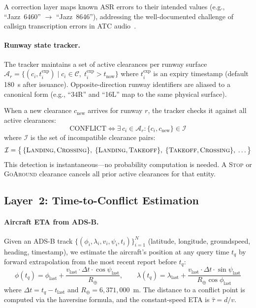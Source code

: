 \documentclass[11pt,a4paper]{article}
\begin{document}
A correction layer maps known ASR errors to their intended values (e.g., ``Jazz~6460'' $\to$ ``Jazz~8646''), addressing the well-documented challenge of callsign transcription errors in ATC audio~\citep{zuluaga2023atcnlp}.

\paragraph{Runway state tracker.}
The tracker maintains a set of active clearances per runway surface $\mathcal{A}_r = \{(c_i, t_i^{\mathrm{exp}}) \mid c_i \in \mathcal{C}, \; t_i^{\mathrm{exp}} > t_{\mathrm{now}}\}$ where $t_i^{\mathrm{exp}}$ is an expiry timestamp (default 180~s after issuance).
Opposite-direction runway identifiers are aliased to a canonical form (e.g., ``34R'' and ``16L'' map to the same physical surface).

When a new clearance $c_{\mathrm{new}}$ arrives for runway $r$, the tracker checks it against all active clearances:
\begin{equation}
    \text{CONFLICT} \iff \exists \, c_i \in \mathcal{A}_r : \{c_i, c_{\mathrm{new}}\} \in \mathcal{I}
    \label{eq:conflict}
\end{equation}
where $\mathcal{I}$ is the set of incompatible clearance pairs:
\begin{equation}
    \mathcal{I} = \bigl\{\,\{\textsc{Landing}, \textsc{Crossing}\},\; \{\textsc{Landing}, \textsc{Takeoff}\},\; \{\textsc{Takeoff}, \textsc{Crossing}\},\; \ldots\,\bigr\}
\end{equation}
This detection is instantaneous---no probability computation is needed.
A \textsc{Stop} or \textsc{GoAround} clearance cancels all prior active clearances for that entity.

\subsection{Layer~2: Time-to-Conflict Estimation}
\label{sec:layer2}

\paragraph{Aircraft ETA from ADS-B.}
Given an ADS-B track $\{(\phi_i, \lambda_i, v_i, \psi_i, t_i)\}_{i=1}^{N}$ (latitude, longitude, groundspeed, heading, timestamp), we estimate the aircraft's position at any query time $t_q$ by forward extrapolation from the most recent report before $t_q$:
\begin{equation}
    \phi(t_q) = \phi_{\mathrm{last}} + \frac{v_{\mathrm{last}} \cdot \Delta t \cdot \cos\psi_{\mathrm{last}}}{R_\oplus}, \qquad
    \lambda(t_q) = \lambda_{\mathrm{last}} + \frac{v_{\mathrm{last}} \cdot \Delta t \cdot \sin\psi_{\mathrm{last}}}{R_\oplus \cos\phi_{\mathrm{last}}}
    \label{eq:extrapolate}
\end{equation}
where $\Delta t = t_q - t_{\mathrm{last}}$ and $R_\oplus = 6{,}371{,}000$~m.
The distance to a conflict point is computed via the haversine formula, and the constant-speed ETA is $\hat{\tau} = d / v$.
\end{document}
